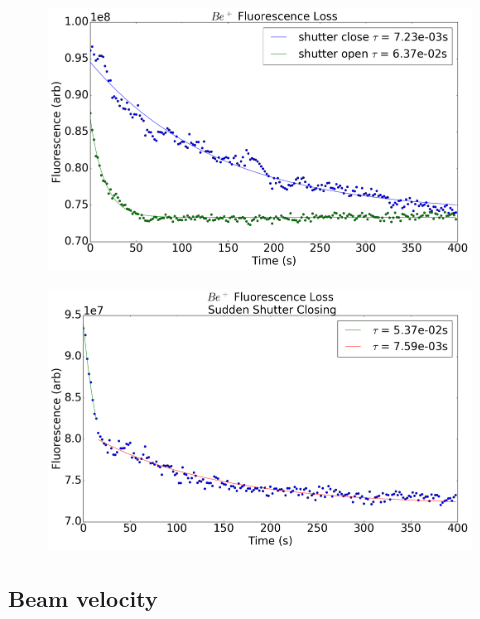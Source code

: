\documentclass[a4paper]{article}
\begin{document}
\begin{figure}[H] \label{f: shutter_bkg}
\centering
\includegraphics[width=1\textwidth]{sudden_shutter_flow_15_bkg.png}
\caption{}
\end{figure}

\begin{figure}[H] \label{f: shutter_closing}
\centering
\includegraphics[width=1\textwidth]{sudden_shutter_flow_15_6.png}
\caption{}
\end{figure}

\subsection{Beam velocity}
\end{document}
